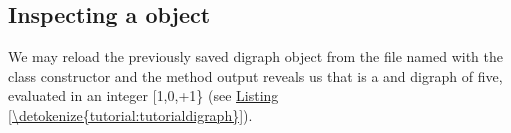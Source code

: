 \documentclass[a4paper,12pt,english]{sphinxhowto}
\begin{document}
\subsection{Inspecting a  object}
\label{\detokenize{tutorial:inspecting-a-digraph-object}}
We may reload the previously saved digraph object from the file named  with the  class constructor and the  method output reveals us that  is a  and  digraph of  five, evaluated in an integer  {[}\sphinxhyphen{}1,0,+1\} (see \hyperref[\detokenize{tutorial:tutorialdigraph}]{Listing \ref{\detokenize{tutorial:tutorialdigraph}}}).
\def\sphinxLiteralBlockLabel{\label{\detokenize{tutorial:tutorialdigraph}}}
\end{document}
